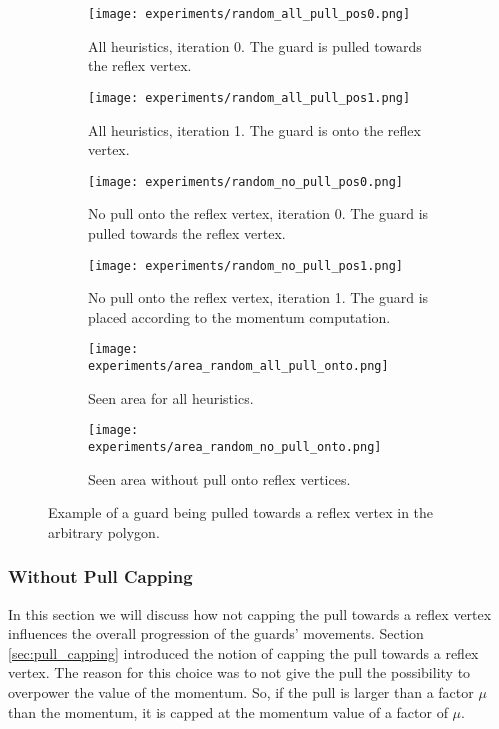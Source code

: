 \begin{figure}[h!]
    \centering
    \begin{subfigure}{0.45\textwidth}
        \texttt{[image: experiments/random\_all\_pull\_pos0.png]}
        \caption{All heuristics, iteration 0. The guard is pulled towards the reflex vertex.}
        \label{fig:all_pull_pos0}
    \end{subfigure}
    \hfill
    \begin{subfigure}{0.45\textwidth}
        \texttt{[image: experiments/random\_all\_pull\_pos1.png]}
        \caption{All heuristics, iteration 1. The guard is onto the reflex vertex.}
        \label{fig:all_pull_pos1}
    \end{subfigure}
    \vfill
    \begin{subfigure}{0.45\textwidth}
        \texttt{[image: experiments/random\_no\_pull\_pos0.png]}
        \caption{No pull onto the reflex vertex, iteration 0. The guard is pulled towards the reflex vertex.}
        \label{fig:no_pull_pos0}
    \end{subfigure}
    \hfill
    \begin{subfigure}{0.45\textwidth}
        \texttt{[image: experiments/random\_no\_pull\_pos1.png]}
        \caption{No pull onto the reflex vertex, iteration 1. The guard is placed according to the momentum computation.}
        \label{fig:no_pull_pos1}
    \end{subfigure}
    \vfill
    \begin{subfigure}{0.45\textwidth}
        \texttt{[image: experiments/area\_random\_all\_pull\_onto.png]}
        \caption{Seen area for all heuristics.}
        \label{fig:area_all_pull}
    \end{subfigure}
    \hfill
    \begin{subfigure}{0.45\textwidth}
        \texttt{[image: experiments/area\_random\_no\_pull\_onto.png]}
        \caption{Seen area without pull onto reflex vertices.}
        \label{fig:area_no_pull}
    \end{subfigure}
    \caption{Example of a guard being pulled towards a reflex vertex in the arbitrary polygon.}
    \label{fig:no_pull}
\end{figure}

\subsubsection{Without Pull Capping}
In this section we will discuss how not capping the pull towards a reflex vertex influences the overall progression of the guards' movements. Section \ref{sec:pull_capping} introduced the notion of capping the pull towards a reflex vertex. The reason for this choice was to not give the pull the possibility to overpower the value of the momentum. So, if the pull is larger than a factor $\mu$ than the momentum, it is capped at the momentum value of a factor of $\mu$. 

